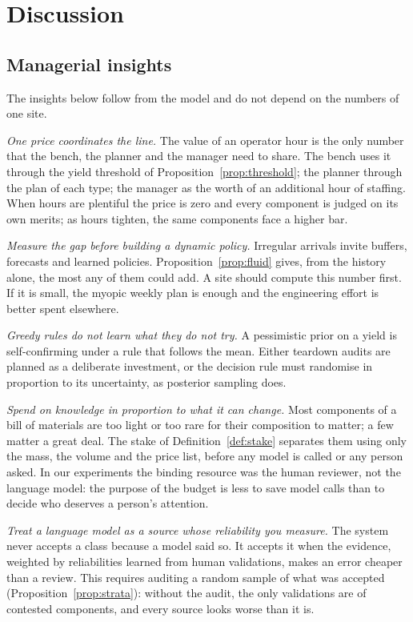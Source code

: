 \section{Discussion}\label{sec:discussion}

\subsection{Managerial insights}

The insights below follow from the model and do not depend on the numbers of one site.

\emph{One price coordinates the line.} The value of an operator hour is the only number that the bench, the planner
and the manager need to share. The bench uses it through the yield threshold of
Proposition~\ref{prop:threshold}; the planner through the plan of each type; the manager as the worth of an
additional hour of staffing. When hours are plentiful the price is zero and every component is judged on its own
merits; as hours tighten, the same components face a higher bar.

\emph{Measure the gap before building a dynamic policy.} Irregular arrivals invite buffers, forecasts and learned
policies. Proposition~\ref{prop:fluid} gives, from the history alone, the most any of them could add. A site should
compute this number first. If it is small, the myopic weekly plan is enough and the engineering effort is better
spent elsewhere.

\emph{Greedy rules do not learn what they do not try.} A pessimistic prior on a yield is self-confirming under a
rule that follows the mean. Either teardown audits are planned as a deliberate investment, or the decision rule
must randomise in proportion to its uncertainty, as posterior sampling does.

\emph{Spend on knowledge in proportion to what it can change.} Most components of a bill of materials are too light
or too rare for their composition to matter; a few matter a great deal. The stake of
Definition~\ref{def:stake} separates them using only the mass, the volume and the price list, before any model is
called or any person asked. In our experiments the binding resource was the human reviewer, not the language
model: the purpose of the budget is less to save model calls than to decide who deserves a person's attention.

\emph{Treat a language model as a source whose reliability you measure.} The system never accepts a class because a
model said so. It accepts it when the evidence, weighted by reliabilities learned from human validations, makes an
error cheaper than a review. This requires auditing a random sample of what was accepted
(Proposition~\ref{prop:strata}): without the audit, the only validations are of contested components, and every
source looks worse than it is.


